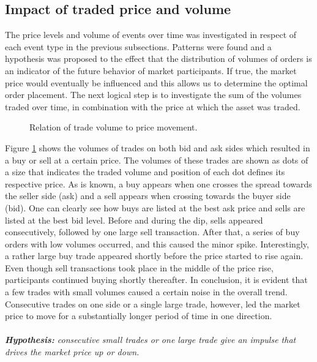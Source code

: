\subsection{Impact of traded price and volume}
\label{sec:data-hypthesis-trade-price-volume}

The price levels and volume of events over time was investigated in respect of each event type in the previous subsections.
Patterns were found and a hypothesis was proposed to the effect that the distribution of volumes of orders is an indicator of the future behavior of market participants. If true, the market price would eventually be influenced and this allows us to determine the optimal order placement.
The next logical step is to investigate the sum of the volumes traded over time, in combination with the price at which the asset was traded.
\begin{figure}[H]
    \centering
    \caption{Relation of trade volume to price movement.}
    \label{fig:data-trade-volume}
\end{figure}
Figure \ref{fig:data-trade-volume} shows the volumes of trades on both bid and ask sides which resulted in a buy or sell at a certain price.
The volumes of these trades are shown as dots of a size that indicates the traded volume and position of each dot defines its respective price.
As is known, a buy appears when one crosses the spread towards the seller side (ask) and a sell appears when crossing towards the buyer side (bid).
One can clearly see how buys are listed at the best ask price and sells are listed at the best bid level.
Before and during the dip, sells appeared consecutively, followed by one large sell transaction.
After that, a series of buy orders with low volumes occurred, and this  caused the minor spike.
Interestingly, a rather large buy trade appeared shortly before the price started to rise again.
Even though sell transactions took place in the middle of the price rise, participants continued buying shortly thereafter.
In conclusion, it is evident that a few trades with small volumes caused a certain noise in the overall trend.
Consecutive trades on one side or a single large trade, however, led the market price to move for a substantially longer period of time in one direction.
\\
\\
\textit{\textbf{Hypothesis:} consecutive small trades or one large trade give an impulse that drives the market price up or down.}


